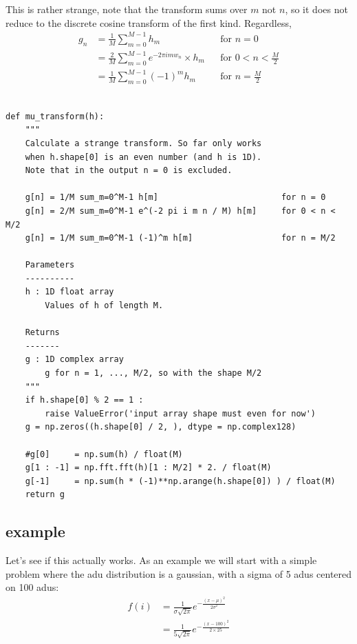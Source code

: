 \documentclass[11pt]{article}
\begin{document}
This is rather strange, note that the transform sums over $m$ not $n$, so it does not reduce to the discrete cosine transform of the first kind. Regardless, 
\begin{align}
   g_n &= \frac{1}{M} \sum_{m=0}^{M-1} h_m                      &&\text{for } n = 0 \\
   &= \frac{2}{M} \sum_{m=0}^{M-1} e^{-2\pi i m w_n} \times h_m &&\text{for } 0 < n < \frac{M}{2} \\
   &= \frac{1}{M} \sum_{m=0}^{M-1} (-1)^m h_m                   &&\text{for } n = \frac{M}{2}
\end{align}

\pagebreak
\begin{verbatim}

def mu_transform(h):
    """
    Calculate a strange transform. So far only works
    when h.shape[0] is an even number (and h is 1D).
    Note that in the output n = 0 is excluded.
	
    g[n] = 1/M sum_m=0^M-1 h[m]                         for n = 0
    g[n] = 2/M sum_m=0^M-1 e^(-2 pi i m n / M) h[m]     for 0 < n < M/2
    g[n] = 1/M sum_m=0^M-1 (-1)^m h[m]                  for n = M/2
    
    Parameters
    ----------
    h : 1D float array
        Values of h of length M.
            
    Returns
    -------
    g : 1D complex array
        g for n = 1, ..., M/2, so with the shape M/2 
    """
    if h.shape[0] % 2 == 1 :
        raise ValueError('input array shape must even for now')
    g = np.zeros((h.shape[0] / 2, ), dtype = np.complex128)
    
    #g[0]     = np.sum(h) / float(M)
    g[1 : -1] = np.fft.fft(h)[1 : M/2] * 2. / float(M)
    g[-1]     = np.sum(h * (-1)**np.arange(h.shape[0]) ) / float(M)
    return g
\end{verbatim}





\subsection{example}
Let's see if this actually works. As an example we will start with a simple problem where the adu distribution is a gaussian, with a sigma of 5 adus centered on 100 adus:
\begin{align}
   f(i) &= \frac{1}{\sigma \sqrt{2\pi}} e^{- \frac{(x - \mu)^2}{2\sigma^2}} \\
        &= \frac{1}{5 \sqrt{2\pi}} e^{- \frac{(x - 100)^2}{2\times 25}}
\end{align}
\end{document}
